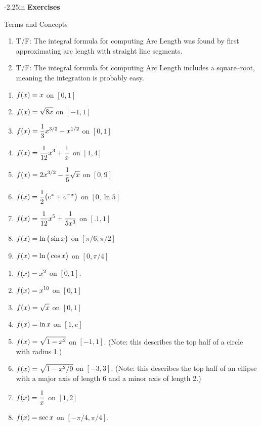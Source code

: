 \begin{adjustwidth*}{}{-2.25in}
\textbf{{\large Exercises}}
\setlength{\columnsep}{25pt}
\begin{multicols*}{2}
\noindent Terms and Concepts \small
\begin{enumerate}[1)]
\item T/F: The integral formula for computing Arc Length was found by first approximating arc length with straight line segments.
\item T/F: The integral formula for computing Arc Length includes a square--root, meaning the integration is probably easy.
\end{enumerate} 

 \small


\begin{enumerate}[1),resume]
\item $\displaystyle f(x) = x$ on $[0, 1]$
\item $\displaystyle f(x) = \sqrt{8x}$ on $[-1, 1]$
\item $\displaystyle f(x) = \frac13x^{3/2}-x^{1/2}$ on $[0,1]$
\item $\displaystyle f(x) = \frac1{12}x^{3}+\frac1x$ on $[1,4]$
\item $\displaystyle f(x) = 2x^{3/2}-\frac16\sqrt{x}$ on $[0,9]$
\item $\displaystyle f(x) = \frac12\big(e^x+e^{-x}\big)$ on $[0, \ln 5]$
\item $\displaystyle f(x) = \frac1{12}x^5+\frac1{5x^3}$ on $[.1, 1]$
\item $\displaystyle f(x) = \ln \big(\sin x\big)$ on $[\pi/6, \pi/2]$
\item $\displaystyle f(x) = \ln \big(\cos x\big)$ on $[0, \pi/4]$
\end{enumerate}


\begin{enumerate}[1),resume]
\item $\displaystyle f(x) = x^2$ on $[0, 1]$.\label{ex_07_04_ex_13}
\item $\displaystyle f(x) = x^{10}$ on $[0, 1]$
\item $\displaystyle f(x) = \sqrt{x}$ on $[0, 1]$
\item $\displaystyle f(x) = \ln x$ on $[1, e]$
\item $\displaystyle f(x) = \sqrt{1-x^2}$ on $[-1, 1]$. (Note: this describes the top half of a circle with radius 1.)
\item $\displaystyle f(x) = \sqrt{1-x^2/9}$ on $[-3, 3]$. (Note: this describes the top half of an ellipse with a major axis of length 6 and a minor axis of length 2.)
\item $\displaystyle f(x) = \frac1x$ on $[1,2]$
\item $\displaystyle f(x) = \sec x$ on $[-\pi/4,\pi/4]$.\label{ex_07_04_ex_20}
\end{enumerate}


\end{multicols*}
\end{adjustwidth*}
